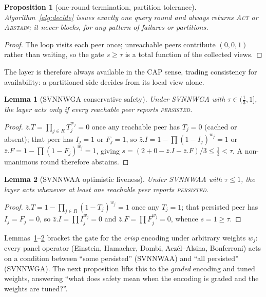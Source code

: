 \documentclass[fleqn,10pt]{wlscirep}
\newtheorem{proposition}{Proposition}
\newtheorem{lemma}{Lemma}
\begin{document}
\begin{proposition}[one-round termination, partition tolerance]\label{prop:terminate}
Algorithm~\ref{alg:decide} issues exactly one query round and always returns \textsc{Act} or
\textsc{Abstain}; it never blocks, for any pattern of failures or partitions.
\end{proposition}
\begin{proof}
The loop visits each peer once; unreachable peers contribute $(0,0,1)$ rather than waiting, so the gate
$s\ge\tau$ is a total function of the collected views.
\end{proof}
\noindent The layer is therefore always available in the CAP sense, trading consistency for
availability: a partitioned side decides from its local view alone.

\begin{lemma}[SVNNWGA conservative safety]\label{lem:wga}
Under SVNNWGA with $\tau\in(\tfrac13,1]$, the layer acts only if \emph{every} reachable peer reports
\textsc{persisted}.
\end{lemma}
\begin{proof}
$\bar z.T=\prod_{j\in R}T_j^{w_j}=0$ once any reachable peer has $T_j=0$ (cached or absent); that peer
has $I_j=1$ or $F_j=1$, so $\bar z.I=1-\prod(1-I_j)^{w_j}=1$ or $\bar z.F=1-\prod(1-F_j)^{w_j}=1$, giving
$s=(2+0-\bar z.I-\bar z.F)/3\le\tfrac13<\tau$. A non-unanimous round therefore abstains.
\end{proof}

\begin{lemma}[SVNNWAA optimistic liveness]\label{lem:waa}
Under SVNNWAA with $\tau\le1$, the layer acts whenever at least one reachable peer reports
\textsc{persisted}.
\end{lemma}
\begin{proof}
$\bar z.T=1-\prod_{j\in R}(1-T_j)^{w_j}=1$ once any $T_j=1$; that persisted peer has $I_j=F_j=0$, so
$\bar z.I=\prod I_j^{w_j}=0$ and $\bar z.F=\prod F_j^{w_j}=0$, whence $s=1\ge\tau$.
\end{proof}

\noindent Lemmas~\ref{lem:wga}--\ref{lem:waa} bracket the gate for the \emph{crisp} encoding under
arbitrary weights $w_j$: every panel operator (Einstein, Hamacher, Dombi, Acz\'el--Alsina, Bonferroni)
acts on a condition between ``some persisted'' (SVNNWAA) and ``all persisted'' (SVNNWGA). The next
proposition lifts this to the \emph{graded} encoding and tuned weights, answering ``what does safety mean
when the encoding is graded and the weights are tuned?''.
\end{document}
